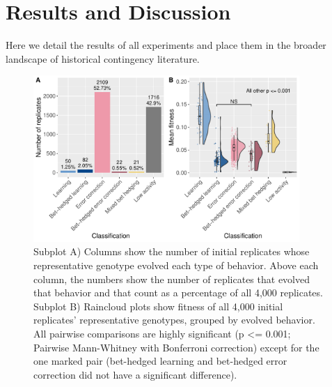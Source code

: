 
\section{Results and Discussion}

Here we detail the results of all experiments and place them in the broader landscape of historical contingency literature. 

\begin{figure}[h!]
\begin{center}
\includegraphics[width=0.9\textwidth]{04_learning_extension/media/initial_reps_stats.pdf}
\end{center}
\caption{ 
Subplot A) Columns show the number of initial replicates whose representative genotype evolved each type of behavior. 
Above each column, the numbers show the number of replicates that evolved that behavior and that count as a percentage of all 4,000 replicates. %
Subplot B) Raincloud plots show fitness of all 4,000 initial replicates' representative genotypes, grouped by evolved behavior.
All pairwise comparisons are highly significant (p <= 0.001; Pairwise Mann-Whitney with Bonferroni correction) except for the one marked pair (bet-hedged learning and bet-hedged error correction did not have a significant difference).
}\label{fig:initial_reps}
\end{figure}


